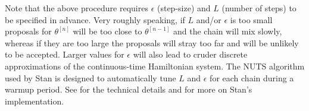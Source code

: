 Note that the above procedure requires $\epsilon$ (step-size) and $L$ (number of steps) to be specified in advance. Very roughly speaking, if $L$ and/or $\epsilon$ is too small proposals for $\theta^{[n]}$ will be too close to $\theta^{[n-1]}$ and the chain will mix slowly, whereas if they are too large the proposals will stray too far and will be unlikely to be accepted. Larger values for $\epsilon$ will also lead to cruder discrete approximations of the continuous-time Hamiltonian system. The NUTS algorithm  used by Stan is designed to automatically tune $L$ and $\epsilon$ for each chain during a warmup period. See  for the technical details and  for more on Stan's implementation. 




